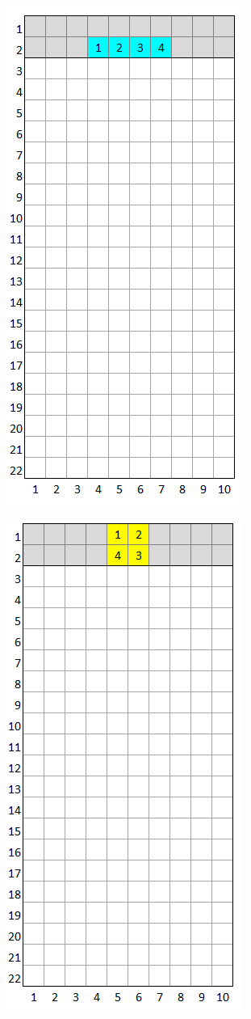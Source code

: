 \documentclass[a4paper]{article}
\begin{document}
	\centering
	\begin{minipage}{0.2\textwidth}
		\centering
		\includegraphics[scale=0.4]{resources/img/minos/mino_cyan}
		\label{fig:mino-cyan}
	\end{minipage}%
	\begin{minipage}{0.2\textwidth}
		\centering
		\includegraphics[scale=0.4]{resources/img/minos/mino_yellow}
		\label{fig:mino-yellow}
	\end{minipage}%
\end{document}
